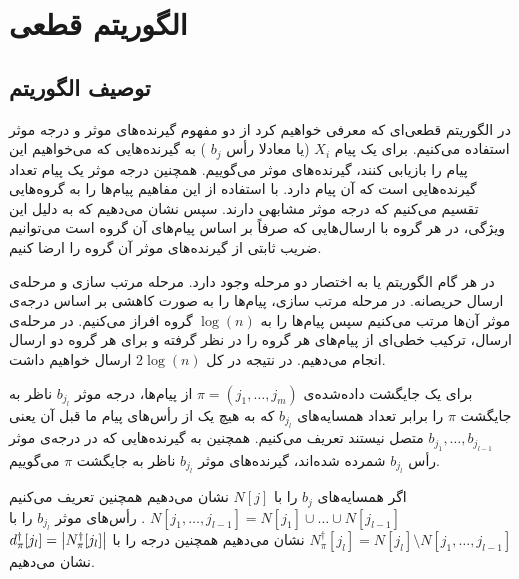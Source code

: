 \section{
    الگوریتم قطعی
}
\subsection{
    توصیف الگوریتم
}

در الگوریتم قطعی‌ای که معرفی خواهیم کرد از دو مفهوم گیرنده‌های موثر و درجه موثر استفاده می‌کنیم. برای یک پیام
$X_i$
(یا معادلا رأس
$b_j$
)
به گیرنده‌هایی که می‌خواهیم این پیام را بازیابی کنند، گیرنده‌های موثر می‌گوییم. همچنین درجه موثر یک پیام تعداد گیرنده‌هایی است که آن پیام دارد. با استفاده از این مفاهیم پیام‌ها را به گروه‌هایی تقسیم می‌کنیم که درجه موثر مشابهی دارند. سپس نشان می‌دهیم که به دلیل این ویژگی، در هر گروه با ارسال‌هایی که صرفاً بر اساس پیام‌های آن گروه است می‌توانیم ضریب ثابتی از گیرنده‌های موثر آن گروه را ارضا کنیم.

در هر گام الگوریتم
یا به اختصار
دو مرحله وجود دارد. مرحله مرتب سازی و مرحله‌ی ارسال حریصانه. در مرحله مرتب سازی، پیام‌ها را به صورت کاهشی بر اساس درجه‌ی موثر آن‌ها مرتب می‌کنیم سپس پیام‌ها را به
$\log(n)$
گروه افراز می‌کنیم. در مرحله‌ی ارسال، ترکیب خطی‌ای از پیام‌های هر گروه را در نظر گرفته و برای هر گروه دو ارسال انجام می‌دهیم. در نتیجه در کل
$2 \log(n)$
ارسال خواهیم داشت.

\begin{definition}
    برای یک جایگشت داده‌شده‌ی
    $\pi = (j_1, \ldots, j_m)$
    از پیام‌ها، درجه موثر
    $b_{j_l}$
    ناظر به جایگشت
    $\pi$
    را برابر تعداد همسایه‌های
    $b_{j_l}$
    که به هیچ یک از رأس‌‌های پیام ما قبل آن یعنی
    $b_{j_1}, \ldots, b_{j_{l - 1}}$
    متصل نیستند تعریف می‌کنیم. همچنین به گیرنده‌هایی که در درجه‌ی موثر رأس
    $b_{j_l}$
    شمرده شده‌اند، گیرنده‌های موثر
    $b_{j_l}$
    ناظر به جایگشت
    $\pi$
    می‌گوییم.
\end{definition}
\begin{notation}
    اگر همسایه‌های
    $b_j$
    را با
    $N[j]$
    نشان می‌دهیم همچنین تعریف می‌کنیم
    $N[j_1, \ldots, j_{l - 1}] = N[j_1] \cup \ldots \cup N[j_{l - 1}]$
    . رأس‌های موثر
    $b_{j_l}$
    را با
    $N^\dagger_\pi [j_l] = N[j_l] \setminus N[j_1, \ldots, j_{l - 1}]$
    نشان می‌دهیم همچنین درجه را با
    $d^\dagger_\pi[j_l] = \left|{N^\dagger_\pi [j_l] }\right|$
    نشان می‌دهیم.
\end{notation}


